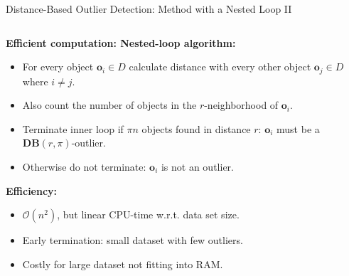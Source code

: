 \begin{frame}{Distance-Based Outlier Detection: Method with a Nested Loop II}
	\begin{columns}[t]
		\begin{column}{0.5\textwidth}
			\vspace*{-0.5em}
			\textbf{Efficient computation: {\color{airforceblue}Nested-loop algorithm}:}
			\begin{itemize}
				\item For every object $\mathbf{o}_i\in D$ calculate distance with every other object $\mathbf{o}_j \in D$ where $i\neq j$.
				\item Also count the number of objects in the $r$-neighborhood of $\mathbf{o}_i$.
				\item Terminate inner loop if $\pi n$ objects found in distance $r$: $\mathbf{o}_i$ must be a $\mathbf{DB}(r, \pi)$-outlier.
				\item Otherwise do not terminate: $\mathbf{o}_i$ is not an outlier.
			\end{itemize}
			\textbf{Efficiency:}
			\begin{itemize}
				\item $\mathcal{O}(n^2)$, but linear CPU-time w.r.t. data set size.
				\item Early termination: small dataset with few outliers.
				\item Costly for large dataset not fitting into RAM.
			\end{itemize}
		\end{column}

		\begin{column}{0.5\textwidth}
			\vspace*{1em}
			\scriptsize
			\begin{algorithm}[H]
				\SetAlgoVlined
				\BlankLine
				\BlankLine
			\end{algorithm}
		\end{column}
	\end{columns}
\end{frame}


